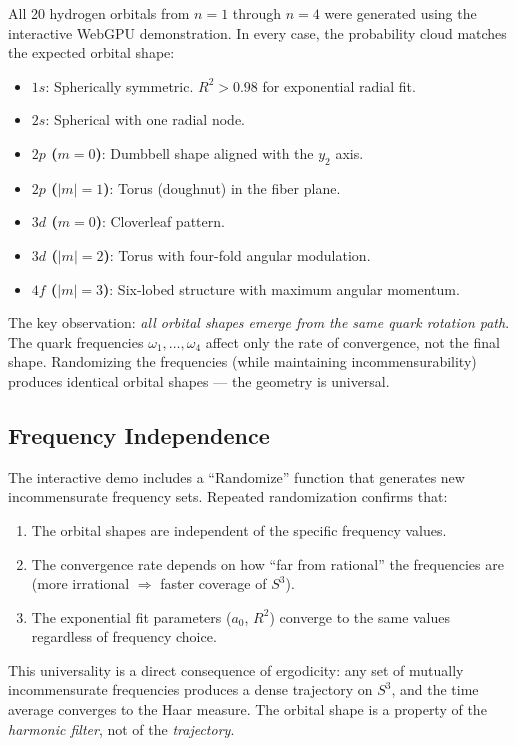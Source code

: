 \documentclass[12pt, a4paper]{article}
\theoremstyle{definition}
\theoremstyle{remark}
\newcommand{\Sthree}{S^3}
\begin{document}
All 20 hydrogen orbitals from $n=1$ through $n=4$ were generated using the
interactive WebGPU demonstration. In every case, the probability cloud
matches the expected orbital shape:

\begin{itemize}[nosep]
  \item \textbf{$1s$}: Spherically symmetric. $R^2 > 0.98$ for exponential
    radial fit.
  \item \textbf{$2s$}: Spherical with one radial node.
  \item \textbf{$2p$ ($m=0$)}: Dumbbell shape aligned with the $y_2$ axis.
  \item \textbf{$2p$ ($|m|=1$)}: Torus (doughnut) in the fiber plane.
  \item \textbf{$3d$ ($m=0$)}: Cloverleaf pattern.
  \item \textbf{$3d$ ($|m|=2$)}: Torus with four-fold angular modulation.
  \item \textbf{$4f$ ($|m|=3$)}: Six-lobed structure with maximum angular
    momentum.
\end{itemize}

The key observation: \emph{all orbital shapes emerge from the same quark
rotation path}. The quark frequencies $\omega_1, \ldots, \omega_4$ affect
only the rate of convergence, not the final shape. Randomizing the
frequencies (while maintaining incommensurability) produces identical
orbital shapes --- the geometry is universal.

\subsection{Frequency Independence}

The interactive demo includes a ``Randomize'' function that generates new
incommensurate frequency sets. Repeated randomization confirms that:
\begin{enumerate}[nosep]
  \item The orbital shapes are independent of the specific frequency values.
  \item The convergence rate depends on how ``far from rational'' the
    frequencies are (more irrational $\Rightarrow$ faster coverage of
    $\Sthree$).
  \item The exponential fit parameters ($a_0$, $R^2$) converge to the same
    values regardless of frequency choice.
\end{enumerate}

This universality is a direct consequence of ergodicity: any set of
mutually incommensurate frequencies produces a dense trajectory on $\Sthree$,
and the time average converges to the Haar measure. The orbital shape is a
property of the \emph{harmonic filter}, not of the \emph{trajectory}.
\end{document}
